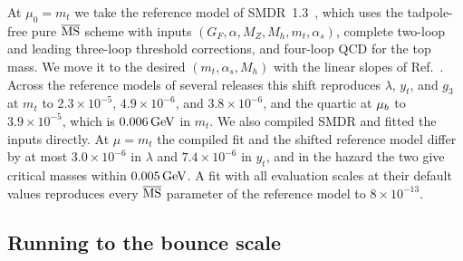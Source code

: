 At $\mu_0=m_t$ we take the reference model of SMDR~1.3~\cite{Martin:2019lqd}, which uses the tadpole-free pure $\overline{\mathrm{MS}}$ scheme with inputs $(G_F,\alpha,M_Z,M_h,m_t,\alpha_s)$, complete two-loop and leading three-loop threshold corrections, and four-loop QCD for the top mass.
We move it to the desired $(m_t,\alpha_s,M_h)$ with the linear slopes of Ref.~\cite{Buttazzo:2013uya}.
Across the reference models of several releases this shift reproduces $\lambda$, $y_t$, and $g_3$ at $m_t$ to $2.3\times10^{-5}$, $4.9\times10^{-6}$, and $3.8\times10^{-6}$, and the quartic at $\mu_b$ to $3.9\times10^{-5}$, which is $0.006\,\mathrm{GeV}$ in $m_t$. %
We also compiled SMDR and fitted the inputs directly.
At $\mu=m_t$ the compiled fit and the shifted reference model differ by at most $3.0\times10^{-6}$ in $\lambda$ and $7.4\times10^{-6}$ in $y_t$, and in the hazard the two give critical masses within $0.005\,\mathrm{GeV}$. %
A fit with all evaluation scales at their default values reproduces every $\overline{\mathrm{MS}}$ parameter of the reference model to $8\times10^{-13}$. %

\subsection{Running to the bounce scale}
\label{sec:rb-sm-running}

